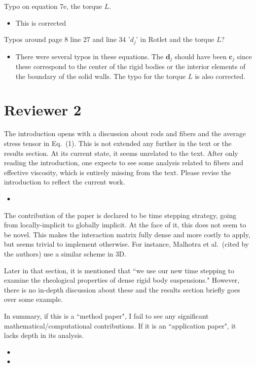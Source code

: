 \documentclass[11pt]{article}
\newcommand{\comment}[1]{{\color{blue} #1}}
\begin{document}
\noindent
\comment{Typo on equation 7e, the torque $L$.}
\begin{itemize}
  \item This is corrected
\end{itemize}

\noindent
\comment{Typos around page 8 line 27 and line 34 '$d_j$' in Rotlet and the
torque $L$?}
\begin{itemize}
  \item There were several typos in these equations.  The $\mathbf{d}_j$
    should have been $\mathbf{c}_j$ since these correspond to the center
    of the rigid bodies or the interior elements of the boundary of the
    solid walls.  The typo for the torque $L$ is also corrected.
\end{itemize}


\section*{Reviewer 2}
\noindent
\comment{The introduction opens with a discussion about rods and fibers
  and the average stress tensor in Eq.~(1). This is not extended any
  further in the text or the results section. At its current state, it
  seems unrelated to the text. After only reading the introduction, one
  expects to see some analysis related to fibers and effective
viscosity, which is entirely missing from the text. Please revise the
introduction to reflect the current work.}
\begin{itemize}
  \item {}
\end{itemize}


\noindent
\comment{The contribution of the paper is declared to be time stepping
  strategy, going from locally-implicit to globally implicit. At the
  face of it, this does not seem to be novel. This makes the interaction
  matrix fully dense and more costly to apply, but seems trivial to
  implement otherwise. For instance, Malhotra et al.~(cited by the
authors) use a similar scheme in 3D.

Later in that section, it is mentioned that ``we use our new time
stepping to examine the rheological properties of dense rigid body
suspensions." However, there is no in-depth discussion about these and
the results section briefly goes over some example.

In summary, if this is a ``method paper", I fail to see any significant
mathematical/computational contributions. If it is an ``application
paper", it lacks depth in its analysis.}
\begin{itemize}
  \item {}
  \item {}
\end{itemize}
\end{document}
